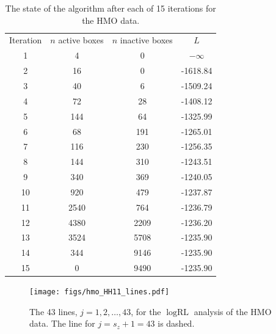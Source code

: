\documentclass{report}
\newcommand{\RLorig}{\text{RL}}
\newcommand{\logRLorig}{\log\RLorig}
\begin{document}
\begin{table}[h]
\centering
\begin{tabular}{|c|c|c|c|}
\hline
Iteration & $n$ active boxes & $n$ inactive boxes & $L$\\
1 & 4 & 0 & $-\infty$\\
2 & 16 & 0 & -1618.84\\
3 & 40 & 6 & -1509.24\\
4 & 72 & 28 & -1408.12\\
5 & 144 & 64 & -1325.99\\
6 & 68 & 191 & -1265.01\\
7 & 116 & 230 & -1256.35\\
8 & 144 & 310 & -1243.51\\
9 & 340 & 369 & -1240.05\\
10 & 920 & 479 & -1237.87\\
11 & 2540 & 764 & -1236.79\\
12 & 4380 & 2209 & -1236.20\\
13 & 3524 & 5708 & -1235.90\\
14 & 344 & 9146 & -1235.90\\
15 & 0 & 9490 & -1235.90\\
\hline
\end{tabular}
\caption{The state of the algorithm after each of 15 iterations for the HMO data.}
\label{table:hmo_HH11_run}
\end{table}

\begin{figure}
	\centering
	\texttt{[image: figs/hmo\_HH11\_lines.pdf]}
	\caption{The 43 lines, $j=1, 2, \dots, 43$, for the $\logRLorig$ analysis of the HMO data.
	              The line for $j = s_z+1 = 43$ is dashed.}
	\label{fig:hmolines}
\end{figure}
\end{document}
